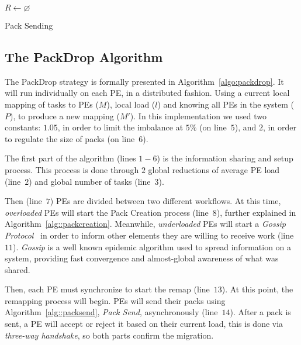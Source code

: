 \begin{algorithm}[!ht]
    \DontPrintSemicolon
    $R \gets \varnothing$ \\
    \caption{Pack Sending}  
    \label{alg::packsend}
\end{algorithm}

\subsection{The PackDrop Algorithm}

The PackDrop strategy is formally presented in Algorithm~\ref{algo:packdrop}. %
It will run individually on each PE, in a distributed fashion. 
Using a current local mapping of tasks to PEs ($  M$), local load ($l$) and knowing all PEs in the system ($  P$), to produce a new mapping ($  M'$).
In this implementation we used two constants: $1.05$, in order to limit the imbalance at $5\%$ (on line~$5$), and $2$, in order to regulate the size of packs (on line~$6$).

The first part of the algorithm (lines $1-6$) is the information sharing and setup process. 
This process is done through $2$ global reductions of average PE load (line~$2$) and global number of tasks (line~$3$).

Then (line~$7$) PEs are divided between two different workflows.
At this time, \textit{overloaded} PEs will start the Pack Creation process (line~$8$), further explained in Algorithm~\ref{alg::packcreation}.
Meanwhile, \textit{underloaded} PEs will start a \textit{Gossip Protocol}~\cite{gossip} in order to inform other elements they are willing to receive work (line~$11$).
\textit{Gossip} is a well known epidemic algorithm used to spread information on a system, providing fast convergence and almost-global awareness of what was shared.

Then, each PE must synchronize to start the remap (line~$13$). 
At this point, the remapping process will begin.
PEs will send their packs using Algorithm~\ref{alg::packsend}, \textit{Pack Send}, asynchronously (line~$14$).
After a pack is sent, a PE will accept or reject it based on their current load, this is done via \textit{three-way handshake}, so both parts confirm the migration.


